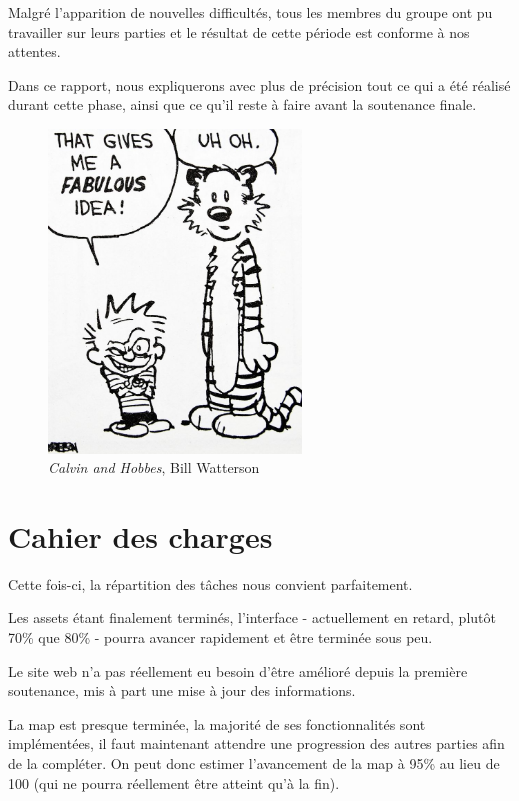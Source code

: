 \documentclass[12pt]{report}
\begin{document}
Malgré l’apparition de nouvelles difficultés, tous les membres du groupe ont pu travailler sur leurs parties et le résultat de cette période est conforme à nos attentes.

Dans ce rapport, nous expliquerons avec plus de précision tout ce qui a été réalisé durant cette phase, ainsi que ce qu’il reste à faire avant la soutenance finale.

\begin{figure}
    \centering
    \includegraphics[width=0.6\textwidth]{project_mood_S2}
    \caption*{\textit{Calvin and Hobbes}, Bill Watterson}
\end{figure}

\chapter{Cahier des charges}

Cette fois-ci, la répartition des tâches nous convient parfaitement. 

Les assets étant finalement terminés, l’interface - actuellement en retard, plutôt 70\% que 80\% - pourra avancer rapidement et être terminée sous peu.

Le site web n’a pas réellement eu besoin d’être amélioré depuis la première soutenance, mis à part une mise à jour des informations.

La map est presque terminée, la majorité de ses fonctionnalités sont implémentées, il faut maintenant attendre une progression des autres parties afin de la compléter. On peut donc estimer l’avancement de la map à 95\% au lieu de 100 (qui ne pourra réellement être atteint qu’à la fin).
\end{document}
